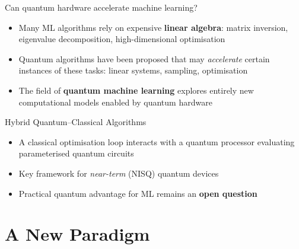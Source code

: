 \documentclass[aspectratio=169]{beamer}
\begin{document}
\begin{frame}{Can quantum hardware accelerate machine learning?}

  \begin{itemize}
    \item Many ML algorithms rely on expensive \textbf{linear algebra}:
          matrix inversion, eigenvalue decomposition, high-dimensional
          optimisation
    \medskip
    \item Quantum algorithms have been proposed that may \emph{accelerate}
          certain instances of these tasks: linear systems, sampling,
          optimisation
    \medskip
    \item The field of \textbf{quantum machine learning} explores entirely
          new computational models enabled by quantum hardware
  \end{itemize}

  \medskip
  \begin{block}{Hybrid Quantum--Classical Algorithms}
    \begin{itemize}
      \item A classical optimisation loop interacts with a quantum
            processor evaluating parameterised quantum circuits
      \item Key framework for \emph{near-term} (NISQ) quantum devices
      \item Practical quantum advantage for ML remains an \textbf{open question}
    \end{itemize}
  \end{block}

\end{frame}

\section{A New Paradigm}
\end{document}
